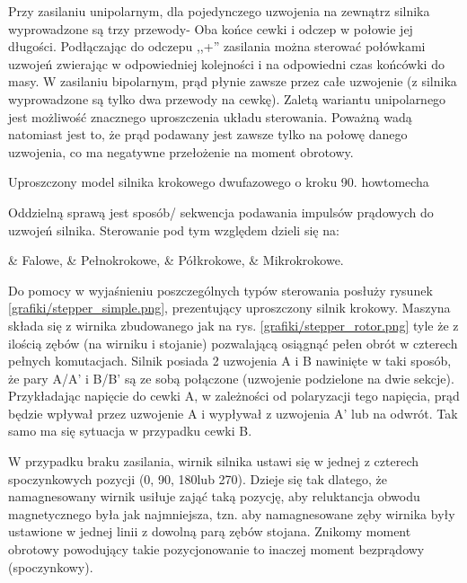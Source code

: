 Przy zasilaniu unipolarnym, dla pojedynczego uzwojenia na zewnątrz silnika wyprowadzone są trzy przewody- Oba końce cewki i odczep w połowie jej długości. Podłączając do odczepu ,,+'' zasilania można sterować połówkami uzwojeń zwierając w odpowiedniej kolejności i na odpowiedni czas końcówki do masy. W zasilaniu bipolarnym, prąd płynie zawsze przez całe uzwojenie (z silnika wyprowadzone są tylko dwa przewody na cewkę). Zaletą wariantu unipolarnego jest możliwość znacznego uproszczenia układu sterowania. Poważną wadą natomiast jest to, że prąd podawany jest zawsze tylko na połowę danego uzwojenia, co ma negatywne przełożenie na moment obrotowy. 

		{Uproszczony model silnika krokowego dwufazowego o kroku 90\degree.}
		{howtomecha}

Oddzielną sprawą jest sposób/ sekwencja podawania impulsów prądowych do uzwojeń silnika. Sterowanie pod tym względem dzieli się na:

\begin{easylist}
	& Falowe, 
	& Pełnokrokowe, 
	& Półkrokowe,
	& Mikrokrokowe.
	\\
\end{easylist}

Do pomocy w wyjaśnieniu poszczególnych typów sterowania posłuży rysunek \ref{grafiki/stepper_simple.png}, prezentujący uproszczony silnik krokowy. Maszyna składa się z wirnika zbudowanego jak na rys. \ref{grafiki/stepper_rotor.png} tyle że z ilością zębów (na wirniku i stojanie) pozwalającą osiągnąć pełen obrót w czterech pełnych komutacjach. Silnik posiada 2 uzwojenia A i B nawinięte w taki sposób, że pary A/A' i B/B' są ze sobą połączone (uzwojenie podzielone na dwie sekcje). Przykładając napięcie do cewki A, w zależności od polaryzacji tego napięcia, prąd będzie wpływał przez uzwojenie A i wypływał z uzwojenia A' lub na odwrót. Tak samo ma się sytuacja w przypadku cewki B.


W przypadku braku zasilania, wirnik silnika ustawi się w jednej z czterech spoczynkowych pozycji (0\degree, 90\degree, 180\degree lub 270\degree). Dzieje się tak dlatego, że namagnesowany wirnik usiłuje zająć taką pozycję, aby reluktancja obwodu magnetycznego była jak najmniejsza, tzn. aby namagnesowane zęby wirnika były ustawione w jednej linii z dowolną parą zębów stojana. Znikomy moment obrotowy powodujący takie pozycjonowanie to inaczej moment bezprądowy (spoczynkowy). 

